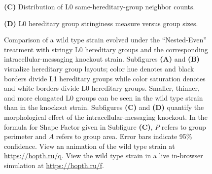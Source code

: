 \begin{figure}[!htbp]
\begin{center}
\begin{minipage}[t]{\linewidth}
\hspace*{\fill}%
\begin{minipage}[t]{0.45\linewidth}
\centering
\vspace{0pt} %
\begin{minipage}[b]{\textwidth}
{\textbf{(C)} Distribution of L0 same-hereditary-group neighbor counts.}
\end{minipage}
\end{minipage}%
\hspace*{\fill}%
\hspace*{\fill}%
\begin{minipage}[t]{0.45\linewidth}
\centering
\vspace{0pt} %
\begin{minipage}[b]{\textwidth}
{\textbf{(D)} L0 hereditary group stringiness measure versus group sizes.}
\end{minipage}
\end{minipage}%
\hspace*{\fill}

\end{minipage}

\caption{
Comparison of a wild type strain evolved under the ``Nested-Even'' treatment with stringy L0 hereditary groups and the corresponding intracellular-messaging knockout strain.
Subfigures \textbf{(A)} and \textbf{(B)} visualize hereditary group layouts;
color hue denotes and black borders divide L1 hereditary groups while color saturation denotes and white borders divide L0 hereditary groups.
Smaller, thinner, and more elongated L0 groups can be seen in the wild type strain than in the knockout strain.
Subfigures \textbf{(C)} and \textbf{(D)} quantify the morphological effect of the intracellular-messaging knockout.
In the formula for Shape Factor given in Subfigure \textbf{(C)}, $P$ refers to group perimeter and $A$ refers to group area.
Error bars indicate 95\% confidence.
View an animation of the wild type strain at \url{https://hopth.ru/q}.
View the wild type strain in a live in-browser simulation at \url{https://hopth.ru/f}.
}
\label{fig:ko-morphology}
\end{center}
\end{figure}
